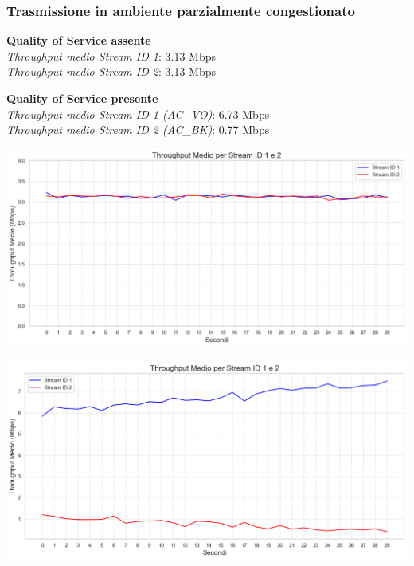 \documentclass{beamer}
\begin{document}
\begin{frame}
    \frametitle{Trasmissione in ambiente parzialmente congestionato}
    
    \begin{minipage}{0.45\textwidth}
        \textbf{Quality of Service assente}\\
        \textit{Throughput medio Stream ID 1}: 3.13 Mbps\\
        \textit{Throughput medio Stream ID 2}: 3.13 Mbps\\
        
        \vspace{1cm}
        
        \textbf{Quality of Service presente}\\
        \textit{Throughput medio Stream ID 1 (AC\_VO)}: 6.73 Mbps\\
        \textit{Throughput medio Stream ID 2 (AC\_BK)}: 0.77 Mbps\\
    \end{minipage}
    \hfill
    \begin{minipage}{0.5\textwidth}
        \centering
        \begin{minipage}{\textwidth}
            \includegraphics[width=\textwidth]{t1_c1_main.png} %
            \vspace{0.5cm}
        \end{minipage}
        \begin{minipage}{\textwidth}
            \includegraphics[width=\textwidth]{t2_c1_main.png} %
        \end{minipage}
    \end{minipage}

\end{frame}
\end{document}
